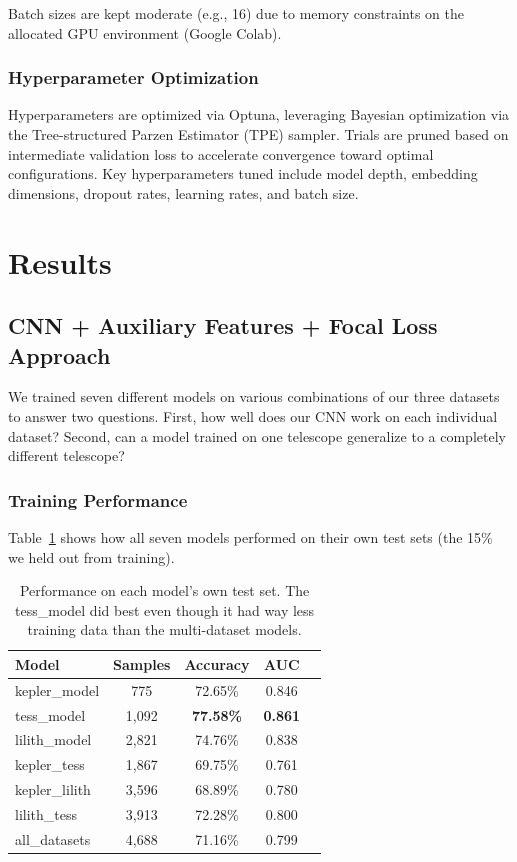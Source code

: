\documentclass[letterpaper]{article} %
\begin{document}
Batch sizes are kept moderate (e.g., 16) due to memory constraints on the allocated GPU environment (Google Colab).

\subsubsection*{Hyperparameter Optimization}
Hyperparameters are optimized via Optuna, leveraging Bayesian optimization via the Tree-structured Parzen Estimator (TPE) sampler. Trials are pruned based on intermediate validation loss to accelerate convergence toward optimal configurations. Key hyperparameters tuned include model depth, embedding dimensions, dropout rates, learning rates, and batch size.

\section*{Results}
\subsection{CNN + Auxiliary Features + Focal Loss Approach}

We trained seven different models on various combinations of our three datasets to answer two questions. First, how well does our CNN work on each individual dataset? Second, can a model trained on one telescope generalize to a completely different telescope?

\subsubsection{Training Performance}

Table~\ref{tab:training_results} shows how all seven models performed on their own test sets (the 15\% we held out from training).

\begin{table}[H]
\centering
\begin{tabular}{lcccc}
\hline
\textbf{Model} & \textbf{Samples} & \textbf{Accuracy} & \textbf{AUC} \\
\hline
kepler\_model & 775 & 72.65\% & 0.846 \\
tess\_model & 1,092 & \textbf{77.58\%} & \textbf{0.861} \\
lilith\_model & 2,821 & 74.76\% & 0.838 \\
\hline
kepler\_tess & 1,867 & 69.75\% & 0.761 \\
kepler\_lilith & 3,596 & 68.89\% & 0.780 \\
lilith\_tess & 3,913 & 72.28\% & 0.800 \\
all\_datasets & 4,688 & 71.16\% & 0.799 \\
\hline
\end{tabular}
\caption{Performance on each model's own test set. The tess\_model did best even though it had way less training data than the multi-dataset models.}
\label{tab:training_results}
\end{table}
\end{document}
